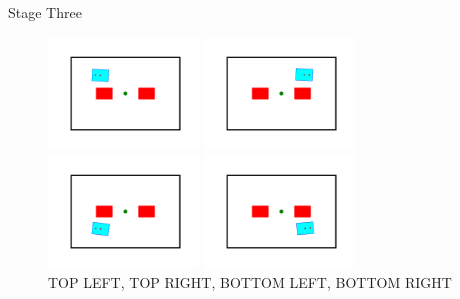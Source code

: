 \documentclass{beamer}
\begin{document}
\begin{frame}{Stage Three}
\begin{figure}
    \centering
    \begin{minipage}{4cm}
    	\includegraphics[width=4cm]{top_left_sim.png}
    \end{minipage}
    \begin{minipage}{4cm}
    	\includegraphics[width=4cm]{top_right_sim.png}
    \end{minipage}
    
    \begin{minipage}{4cm}
    	\includegraphics[width=4cm]{bottom_left_sim.png}
    \end{minipage}
    \begin{minipage}{4cm}
    	\includegraphics[width=4cm]{bottom_right_sim.png}
    \end{minipage}
    
    \caption{TOP LEFT, TOP RIGHT,
        	BOTTOM LEFT, BOTTOM RIGHT}
\end{figure} 
\end{frame}
\end{document}
